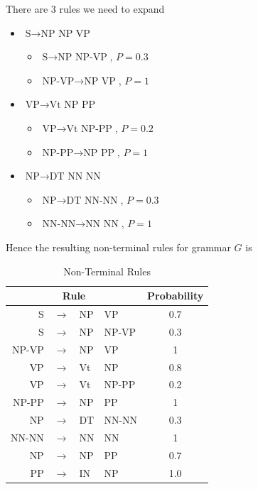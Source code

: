 \documentclass[11pt]{scrartcl}
\newcommand{\n}[1]{\ensuremath{\text{#1}}}
\begin{document}
There are 3 rules we need to expand

\begin{itemize}
\item $\n{S} \rightarrow \n{NP NP VP}$
\begin{itemize}
\item $\n{S} \rightarrow \n{NP NP-VP}$, $P=0.3$
\item $\n{NP-VP} \rightarrow \n{NP VP}$, $P=1$
\end{itemize}

\item $\n{VP} \rightarrow \n{Vt NP PP}$
\begin{itemize}
\item $\n{VP} \rightarrow \n{Vt NP-PP}$, $P=0.2$
\item $\n{NP-PP} \rightarrow \n{NP PP}$, $P=1$
\end{itemize}

\item $\n{NP} \rightarrow \n{DT NN NN}$
\begin{itemize}
\item $\n{NP} \rightarrow \n{DT NN-NN}$, $P=0.3$
\item $\n{NN-NN} \rightarrow \n{NN NN}$, $P=1$
\end{itemize}
\end{itemize}

Hence the resulting non-terminal rules for grammar $G$ is

\begin{table}[H]
\centering
\begin{tabular}{r c l l c}
\toprule
\multicolumn{4}{c}{Rule} & Probability \\
\midrule
S & $\rightarrow$ & NP & VP & 0.7 \\
S & $\rightarrow$ & NP & NP-VP & 0.3 \\ 
NP-VP & $\rightarrow$ & NP & VP & 1 \\
VP & $\rightarrow$ & Vt & NP & 0.8 \\
VP & $\rightarrow$ & Vt & NP-PP & 0.2 \\
NP-PP & $\rightarrow$ & NP & PP & 1 \\
NP & $\rightarrow$ & DT & NN-NN & 0.3 \\
NN-NN & $\rightarrow$ & NN & NN & 1 \\
NP & $\rightarrow$ & NP & PP & 0.7 \\ 
PP & $\rightarrow$ & IN & NP & 1.0 \\
\bottomrule
\end{tabular}
\caption{Non-Terminal Rules}
\label{table:nonterminal_rules}
\end{table}
\end{document}
